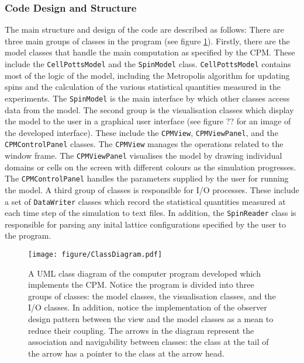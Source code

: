 \documentclass[a4paper,12pt]{article}
\begin{document}
\subsubsection{Code Design and Structure}
The main structure and design of the code are described as follows: There are three main groups of classes in the program (see figure \ref{fig:ClassDiagram}). Firstly, there are the model classes that handle the main computation as specified by the CPM. These include the \texttt{CellPottsModel} and the \texttt{SpinModel} class. \texttt{CellPottsModel} contains most of the logic of the model, including the Metropolis algorithm for updating spins and the calculation of the various statistical quantities measured in the experiments. The \texttt{SpinModel} is the main interface by which other classes access data from the model. The second group is the visualisation classes which display the model to the user in a graphical user interface (see figure ?? for an image of the developed interface). These include the \texttt{CPMView}, \texttt{CPMViewPanel}, and the \texttt{CPMControlPanel} classes. The \texttt{CPMView} manages the operations related to the window frame. The \texttt{CPMViewPanel} visualises the model by drawing individual domains or cells on the screen with different colours as the simulation progresses. The \texttt{CPMControlPanel} handles the parameters supplied by the user for running the model.  A third group of classes is responsible for I/O processes. These include a set of \texttt{DataWriter} classes which record the statistical quantities measured at each time step of the simulation to text files. In addition, the \texttt{SpinReader} class is responsible for parsing any inital lattice configurations specified by the user to the program.  

\begin{figure}[h]
\texttt{[image: figure/ClassDiagram.pdf]}
\caption{A UML class diagram of the computer program developed which implements the CPM. Notice the program is divided into three groups of classes: the model classes, the visualisation classes, and the I/O classes. In addition, notice the implementation of the observer design pattern between the view and the model classes as a mean to reduce their coupling. The arrows in the diagram represent the association and navigability between classes: the class at the tail of the arrow has a pointer to the class at the arrow head.}
\label{fig:ClassDiagram}
\end{figure}
\end{document}

